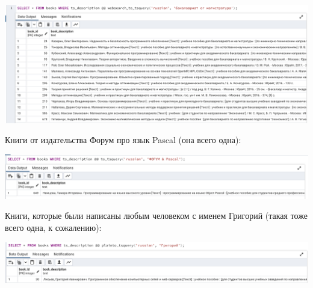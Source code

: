 \documentclass[a4paper,12pt]{article}
\begin{document}
\begin{center}
\includegraphics[scale=0.4]{5.png}
\end{center}
Книги от издательства Форум про язык Pascal (она всего одна):
\begin{center}
\includegraphics[scale=0.4]{6.png}
\end{center}
Книги, которые были написаны любым человеком с именем Григорий (такая тоже всего одна, к сожалению):
\begin{center}
\includegraphics[scale=0.4]{7.png}
\end{center}
\end{document}
